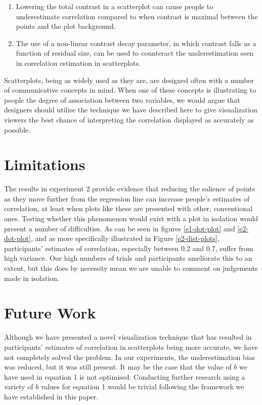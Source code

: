 \documentclass[preprint, 3p,
authoryear]{elsarticle} %
\begin{document}
\begin{enumerate}
\def\labelenumi{\arabic{enumi}.}
\item
  Lowering the total contrast in a scatterplot can cause people to
  underestimate correlation compared to when contrast is maximal between
  the points and the plot background.
\item
  The use of a non-linear contrast decay parameter, in which contrast
  falls as a function of residual size, can be used to counteract the
  underestimation seen in correlation estimation in scatterplots.
\end{enumerate}

Scatterplots, being as widely used as they are, are designed often with
a number of communicative concepts in mind. When one of these concepts
is illustrating to people the degree of association between two
variables, we would argue that designers should utilise the technique we
have described here to give visualization viewers the best chance of
interpreting the correlation displayed as accurately as possible.

\hypertarget{limitations}{%
\section{Limitations}\label{limitations}}

The results in experiment 2 provide evidence that reducing the salience
of points as they move further from the regression line can increase
people's estimates of correlation, at least when plots like these are
presented with other, conventional ones. Testing whether this phenomenon
would exist with a plot in isolation would present a number of
difficulties. As can be seen in figures \ref{e1-dot-plot} and
\ref{e2-dot-plot}, and as more specifically illustrated in Figure
\ref{e2-dist-plots}, participants' estimates of correlation, especially
between 0.2 and 0.7, suffer from high variance. Our high numbers of
trials and participants ameliorate this to an extent, but this does by
necessity mean we are unable to comment on judgements made in isolation.

\hypertarget{future-work}{%
\section{Future Work}\label{future-work}}

Although we have presented a novel visualization technique that has
resulted in participants' estimates of correlation in scatterplots being
more accurate, we have not completely solved the problem. In our
experiments, the underestimation bias was reduced, but it was still
present. It may be the case that the value of \(b\) we have used in
equation 1 is not optimised. Conducting further research using a variety
of \(b\) values for equation 1 would be trivial following the framework
we have established in this paper.
\end{document}
